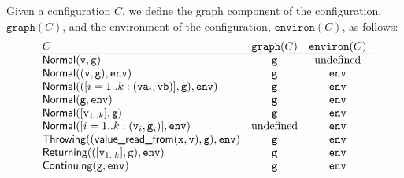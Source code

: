 \documentclass{book}
\newcommand\graphof[1]{\texttt{graph}({#1})}
\newcommand\environof[1]{\texttt{environ}({#1})}
\newcommand\valuereadfrom[0]{\textsf{value\_read\_from}}
\newcommand\Normal[0]{\textsf{Normal}}
\newcommand\Throwing[0]{\textsf{Throwing}}
\newcommand\Continuing[0]{\textsf{Continuing}}
\newcommand\Returning[0]{\textsf{Returning}}
\newcommand\env[0]{\texttt{env}}
\newcommand\vg[0]{\texttt{g}}
\newcommand\vv[0]{\texttt{v}}
\begin{document}
Given a configuration $C$, we define the graph component of the configuration, $\graphof{C}$,
and the environment of the configuration, $\environof{C}$, as follows:
\[
\begin{array}{lcc}
  C & \graphof{C} & \environof{C}\\
  \hline
  \Normal(\vv,\vg) & \vg & \text{undefined}\\
  \Normal((\vv,\vg), \env) & \vg & \env\\
  \Normal(([i=1..k: (\texttt{va}_i,\texttt{vb})],\vg), \env) & \vg & \env\\
  \Normal(\vg, \env) & \vg & \env\\
  \Normal([\vv_{1..k}], \vg) & \vg & \env\\
  \Normal([i=1..k: (\vv_i,\vg_i)], \env) & \text{undefined} & \env\\
  \Throwing((\valuereadfrom(\vx,\vv),\vg), \env) & \vg & \env\\
  \Returning(([\vv_{1..k}],\vg), \env) & \vg & \env\\
  \Continuing(\vg, \env) & \vg & \env\\
\end{array}
\]
\end{document}

